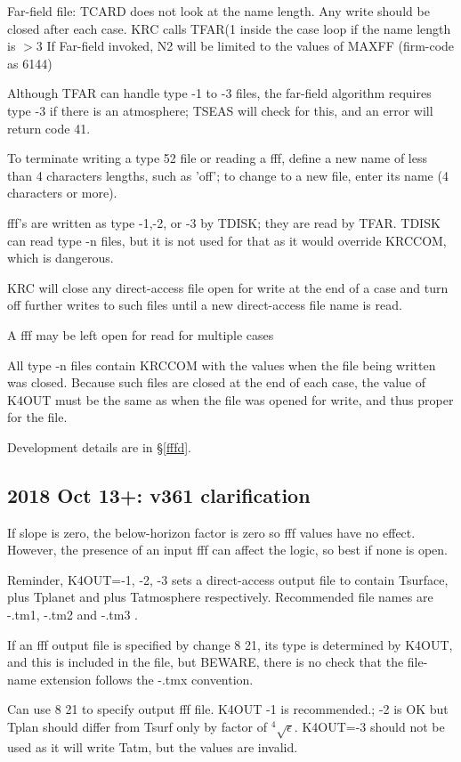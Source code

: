  Far-field file: TCARD does not look at the name length. Any write should be closed after each case.
\qi  KRC calls TFAR(1  inside the case loop if the name length is $>3$
\qi  If Far-field invoked, N2 will be limited to the values of MAXFF (firm-code as 6144)

Although TFAR can handle type -1 to -3 files, the far-field algorithm requires
type -3 if there is an atmosphere; TSEAS will check for this, and an error will
return code 41.

To terminate writing a type 52 file or reading a fff, define a new name of less
than 4 characters lengths, such as 'off'; to change to a new file, enter its
name (4 characters or more).

fff's are written as type -1,-2, or -3 by TDISK; they are read by
TFAR. TDISK can read type -n files, but it is not used for that as it would override KRCCOM, which is dangerous.

KRC will close any direct-access file open for write at the end of a case
and turn off further writes to such files until a new direct-access file name is
read.

A fff may be left open for read for multiple cases

All type -n files contain KRCCOM with the values when the file being written was
closed. Because such files are closed at the end of each case, the value of
K4OUT must be the same as when the file was opened for write, and thus proper
for the file. 

Development details are in \S \ref{fffd}.

\subsection{2018 Oct 13+:  v361 clarification}

If slope is zero, the below-horizon factor is zero so fff values have no effect. However, the presence of an input fff can affect the logic, so best if none is open. 

Reminder, K4OUT=-1, -2, -3 sets a direct-access output file to contain Tsurface, plus Tplanet and plus Tatmosphere respectively. Recommended file names are  -.tm1, -.tm2 and -.tm3 .

If an fff output file is specified by change 8 21, its type is determined by K4OUT, and this is included in the file, but BEWARE, there is no check that the file-name extension follows the -.tmx convention. 

Can use 8 21 to specify output fff file.  K4OUT -1 is
recommended.; -2 is OK but Tplan should differ from Tsurf only by factor of
$^4 \sqrt{\epsilon } $.  K4OUT=-3 should not be used as it will write Tatm, but
the values are invalid.


